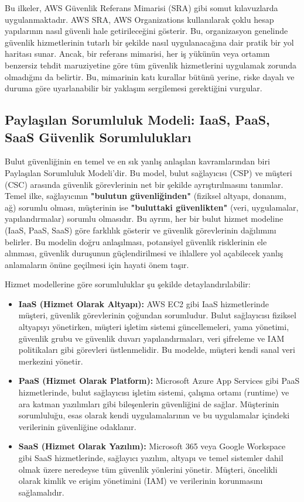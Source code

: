 Bu ilkeler, AWS Güvenlik Referans Mimarisi (SRA) gibi somut kılavuzlarda uygulanmaktadır. AWS SRA, AWS Organizations kullanılarak çoklu hesap yapılarının nasıl güvenli hale getirileceğini gösterir. Bu, organizasyon genelinde güvenlik hizmetlerinin tutarlı bir şekilde nasıl uygulanacağına dair pratik bir yol haritası sunar. Ancak, bir referans mimarisi, her iş yükünün veya ortamın benzersiz tehdit maruziyetine göre tüm güvenlik hizmetlerini uygulamak zorunda olmadığını da belirtir. Bu, mimarinin katı kurallar bütünü yerine, riske dayalı ve duruma göre uyarlanabilir bir yaklaşım sergilemesi gerektiğini vurgular.

\subsection{Paylaşılan Sorumluluk Modeli: IaaS, PaaS, SaaS Güvenlik Sorumlulukları}

Bulut güvenliğinin en temel ve en sık yanlış anlaşılan kavramlarından biri Paylaşılan Sorumluluk Modeli'dir. Bu model, bulut sağlayıcısı (CSP) ve müşteri (CSC) arasında güvenlik görevlerinin net bir şekilde ayrıştırılmasını tanımlar. Temel ilke, sağlayıcının \textbf{"bulutun güvenliğinden"} (fiziksel altyapı, donanım, ağ) sorumlu olması, müşterinin ise \textbf{"buluttaki güvenlikten"} (veri, uygulamalar, yapılandırmalar) sorumlu olmasıdır. Bu ayrım, her bir bulut hizmet modeline (IaaS, PaaS, SaaS) göre farklılık gösterir ve güvenlik görevlerinin dağılımını belirler. Bu modelin doğru anlaşılması, potansiyel güvenlik risklerinin ele alınması, güvenlik duruşunun güçlendirilmesi ve ihlallere yol açabilecek yanlış anlamaların önüne geçilmesi için hayati önem taşır.

Hizmet modellerine göre sorumluluklar şu şekilde detaylandırılabilir:

\begin{itemize}
    \item \textbf{IaaS (Hizmet Olarak Altyapı):} AWS EC2 gibi IaaS hizmetlerinde müşteri, güvenlik görevlerinin çoğundan sorumludur. Bulut sağlayıcısı fiziksel altyapıyı yönetirken, müşteri işletim sistemi güncellemeleri, yama yönetimi, güvenlik grubu ve güvenlik duvarı yapılandırmaları, veri şifreleme ve IAM politikaları gibi görevleri üstlenmelidir. Bu modelde, müşteri kendi sanal veri merkezini yönetir.
    \item \textbf{PaaS (Hizmet Olarak Platform):} Microsoft Azure App Services gibi PaaS hizmetlerinde, bulut sağlayıcısı işletim sistemi, çalışma ortamı (runtime) ve ara katman yazılımları gibi bileşenlerin güvenliğini de sağlar. Müşterinin sorumluluğu, esas olarak kendi uygulamalarının ve bu uygulamalar içindeki verilerinin güvenliğine odaklanır.
    \item \textbf{SaaS (Hizmet Olarak Yazılım):} Microsoft 365 veya Google Workspace gibi SaaS hizmetlerinde, sağlayıcı yazılım, altyapı ve temel sistemler dahil olmak üzere neredeyse tüm güvenlik yönlerini yönetir. Müşteri, öncelikli olarak kimlik ve erişim yönetimini (IAM) ve verilerinin korunmasını sağlamalıdır.
\end{itemize}

